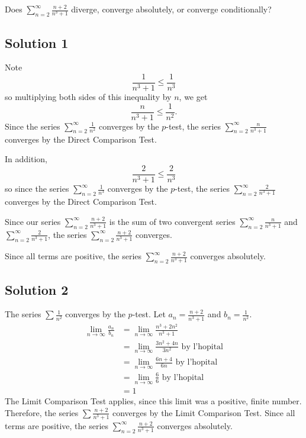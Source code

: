 \documentclass{article}
\begin{document}
\noindent
Does $\displaystyle \sum_{n=2}^\infty \frac{n+2}{n^3+1}$
diverge, converge absolutely, or converge conditionally?

\subsection*{Solution 1}

Note
\[ \frac{1}{n^3+1} \leq \frac1{n^3}\]
so multiplying both sides of this inequality by $n$, we get
\[ \frac{n}{n^3+1} \leq \frac1{n^2}.\]
Since the series $\displaystyle \sum_{n=2}^\infty \frac{1}{n^2}$ converges by the $p$-test, the series $\displaystyle \sum_{n=2}^\infty \frac{n}{n^3+1}$ converges by the Direct Comparison Test.

In addition,
\[ \frac{2}{n^3+1} \leq \frac2{n^3}\]
so since 
the series $\displaystyle \sum_{n=2}^\infty \frac{1}{n^3}$ converges by the $p$-test, the series $\displaystyle \sum_{n=2}^\infty \frac{2}{n^3+1}$ converges by the Direct Comparison Test.

Since our series $\displaystyle \sum_{n=2}^\infty \frac{n+2}{n^3+1}$ is the sum of two convergent series $\displaystyle \sum_{n=2}^\infty \frac{n}{n^3+1}$ and $\displaystyle \sum_{n=2}^\infty \frac{2}{n^3+1}$, the series  $\displaystyle \sum_{n=2}^\infty \frac{n+2}{n^3+1}$ converges.

Since all terms are positive, the series $\displaystyle \sum_{n=2}^\infty \frac{n+2}{n^3+1}$ converges absolutely.


\subsection*{Solution 2}

The series $\sum \frac1{n^2}$ converges by the $p$-test. Let $a_n = \frac{n+2}{n^3+1}$ and $b_n = \frac1{n^2}$.
\begin{align*}
\lim_{n \to \infty} \frac{a_n}{b_n}
&= \lim_{n \to \infty} \frac{n^3+2n^2}{n^3+1}\\
&= \lim_{n \to \infty} \frac{3n^2+4n}{3n^2} \text{ by l'hopital}\\
&= \lim_{n \to \infty} \frac{6n+4}{6n} \text{ by l'hopital}\\
&= \lim_{n \to \infty} \frac66 \text{ by l'hopital}\\
&= 1
\end{align*}
The Limit Comparison Test applies, since this limit was a positive, finite number. Therefore, the series $\sum \frac{n+2}{n^3+1}$ converges by the Limit Comparison Test.
 Since all terms are positive, the series $\displaystyle \sum_{n=2}^\infty \frac{n+2}{n^3+1}$ converges absolutely.
\end{document}

